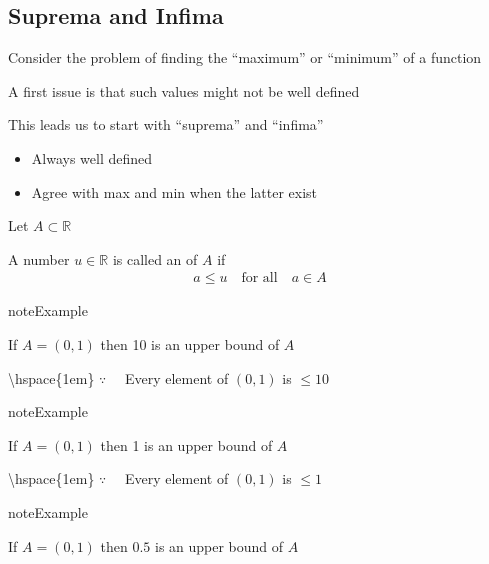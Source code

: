 \documentclass[letterpaper,10pt,english]{jupyterBook}
\begin{document}
\subsection{Suprema and Infima}
\label{\detokenize{06.optimization_fundamentals:id2}}
\sphinxAtStartPar
Consider the problem of finding
the “maximum” or “minimum” of a function

\sphinxAtStartPar
A first issue is that such values might not be well defined

\sphinxAtStartPar
This leads us to start with “suprema” and “infima”
\begin{itemize}
\item {} 
\sphinxAtStartPar
Always well defined

\item {} 
\sphinxAtStartPar
Agree with max and min when the latter exist

\end{itemize}

\sphinxAtStartPar
Let \(A \subset \mathbb{R}\)

\sphinxAtStartPar
A number \(u \in \mathbb{R}\) is called an  of \(A\) if
\begin{equation*}
\begin{split}
%
a \leq u \quad \text{for all} \quad a \in A
%
\end{split}
\end{equation*}
\begin{sphinxadmonition}{note}{Example}

\sphinxAtStartPar
If \(A = (0, 1)\) then 10 is an upper bound of \(A\)
\end{sphinxadmonition}

\sphinxAtStartPar
\textbackslash{}hspace\{1em\} \(\because \quad\) Every element of \((0, 1)\) is \(\leq 10\)

\begin{sphinxadmonition}{note}{Example}

\sphinxAtStartPar
If \(A = (0, 1)\) then 1 is an upper bound of \(A\)
\end{sphinxadmonition}

\sphinxAtStartPar
\textbackslash{}hspace\{1em\} \(\because \quad\) Every element of \((0, 1)\) is \(\leq 1\)

\begin{sphinxadmonition}{note}{Example}

\sphinxAtStartPar
If \(A = (0, 1)\) then \(0.5\) is  an upper bound of \(A\)
\end{sphinxadmonition}
\end{document}
